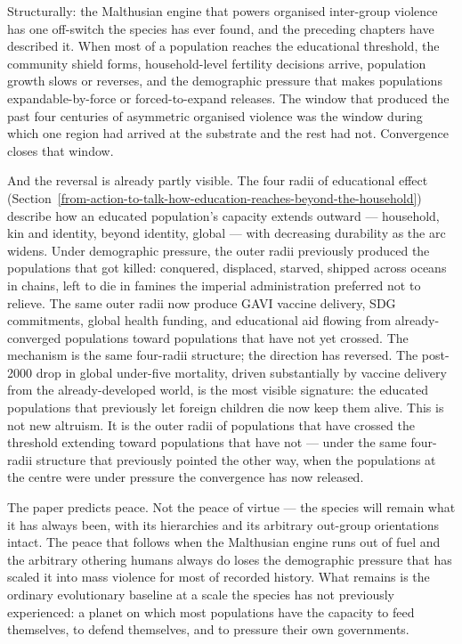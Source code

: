 \documentclass[12pt,letterpaper]{article}
\begin{document}
Structurally: the Malthusian engine that powers organised inter-group
violence has one off-switch the species has ever found, and the
preceding chapters have described it. When most of a population
reaches the educational threshold, the community shield forms,
household-level fertility decisions arrive, population growth slows or
reverses, and the demographic pressure that makes populations
expandable-by-force or forced-to-expand releases. The window that
produced the past four centuries of asymmetric organised violence was
the window during which one region had arrived at the substrate and
the rest had not. Convergence closes that window.

And the reversal is already partly visible. The four radii of
educational effect
(Section~\ref{from-action-to-talk-how-education-reaches-beyond-the-household})
describe how an educated population's capacity extends outward ---
household, kin and identity, beyond identity, global --- with
decreasing durability as the arc widens. Under demographic pressure,
the outer radii previously produced the populations that got killed:
conquered, displaced, starved, shipped across oceans in chains, left
to die in famines the imperial administration preferred not to
relieve. The same outer radii now produce GAVI vaccine delivery, SDG
commitments, global health funding, and educational aid flowing from
already-converged populations toward populations that have not yet
crossed. The mechanism is the same four-radii structure; the
direction has reversed. The post-2000 drop in global under-five
mortality, driven substantially by vaccine delivery from the
already-developed world, is the most visible signature: the educated
populations that previously let foreign children die now keep them
alive. This is not new altruism. It is the outer radii of populations
that have crossed the threshold extending toward populations that
have not --- under the same four-radii structure that previously
pointed the other way, when the populations at the centre were under
pressure the convergence has now released.

The paper predicts peace. Not the peace of virtue --- the species
will remain what it has always been, with its hierarchies and its
arbitrary out-group orientations intact. The peace that follows when
the Malthusian engine runs out of fuel and the arbitrary othering
humans always do loses the demographic pressure that has scaled it
into mass violence for most of recorded history. What remains is the
ordinary evolutionary baseline at a scale the species has not
previously experienced: a planet on which most populations have the
capacity to feed themselves, to defend themselves, and to pressure
their own governments.
\end{document}
